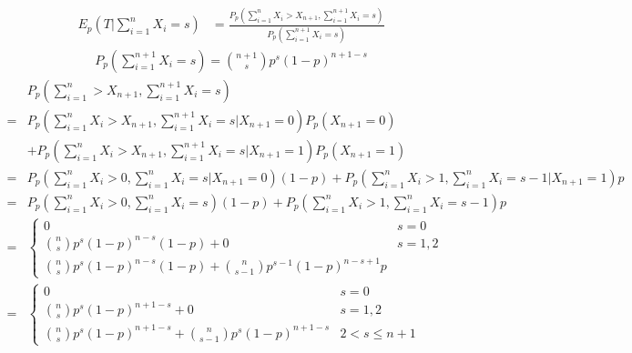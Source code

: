 \documentclass{article}
\begin{document}
\begin{enumerate}[leftmargin = 0 em, label = \arabic*., font = \bfseries]
\begin{enumerate}
		            \begin{align*}
			            E_{p} (T | \sum_{i=1}^n X_i = s) & = \frac{P_p (\sum_{i=1}^n X_i > X_{n+1}, \sum_{i=1}^{n+1} X_{i} = s)}{P_p (\sum_{i=1}^{n+1} X_i = s)}
		            \end{align*}
		            \begin{align*}
			            P_p (\sum_{i=1}^{n+1} X_i = s) = \binom{n+1}{s} p^{s} (1-p)^{n+1 - s}
		            \end{align*}
		            \begin{align*}
			              & P_p (\sum_{i=1}^n > X_{n+1}, \sum_{i=1}^{n+1} X_i = s)                                                                                        \\
			            = & P_p (\sum_{i=1}^n X_i > X_{n+1}, \sum_{i=1}^{n+1} X_i = s | X_{n+1} = 0) P_p (X_{n+1} = 0)                                                    \\
			              & + P_p (\sum_{i=1}^n X_i > X_{n+1}, \sum_{i=1}^{n+1} X_i = s | X_{n+1} = 1) P_p (X_{n+1} = 1)                                                  \\
			            = & P_p (\sum_{i=1}^n X_i > 0, \sum_{i=1}^n X_i = s | X_{n+1} = 0) (1-p) + P_p (\sum_{i=1}^n X_{i} > 1, \sum_{i=1}^n X_i = s - 1 | X_{n+1} = 1) p \\
			            = & P_p (\sum_{i=1}^n X_i > 0, \sum_{i=1}^n X_i = s ) (1-p) + P_p (\sum_{i=1}^n X_{i} > 1, \sum_{i=1}^n X_i = s - 1 ) p                           \\
			            = & \begin{cases}
				            0                                          & s = 0   \\
				            \binom{n}{s} p^s (1-p)^{n - s} (1 - p) + 0 & s = 1,2 \\
				            \binom{n}{s} p^s (1-p)^{n-s} (1-p) + \binom{n}{s-1} p^{s-1} (1-p)^{n-s+1} p
			            \end{cases}                                                                                                                     \\
			            = & \begin{cases}
				            0                                                                   & s = 0          \\
				            \binom{n}{s} p^s (1-p)^{n+1 - s} + 0                                & s = 1,2        \\
				            \binom{n}{s} p^s (1-p)^{n+1-s} + \binom{n}{s-1} p^{s} (1-p)^{n+1-s} & 2 < s \leq n+1
			            \end{cases}                                                                                                                     \\
		            \end{align*}



\end{enumerate}
\end{enumerate}
\end{document}

